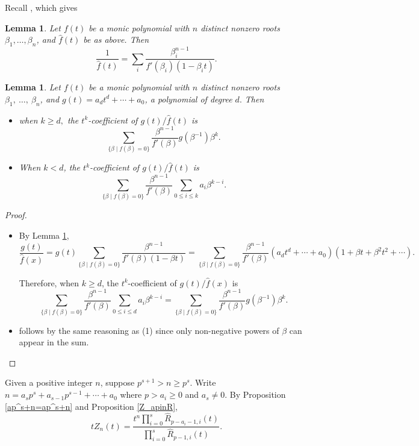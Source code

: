 \documentclass[11 pt]{amsart}
\theoremstyle{plain}
\newtheorem{lemma}[thm]{Lemma}
\theoremstyle{definition}
\theoremstyle{remark}
\def\b{\beta}
\begin{document}
Recall \cite[, Lemma 2.3]{larsen2024boundsmathrmsl2indecomposablestensorpowers}, which gives

\begin{lemma} \label{1/hat}
    Let $f(t)$ be a monic polynomial with $n$ distinct nonzero roots $\b_1, \ldots, \b_n$, and $\hat{f}(t)$ be as above. Then $$\frac{1}{\hat{f}(t)}=\sum_i \frac{\beta_i^{n-1}}{f'(\beta_i)(1-\beta_i t)}.$$
\end{lemma}


\begin{lemma} \label{g/fhat}
   Let $f(t)$ be a monic polynomial with $n$ distinct nonzero roots $\beta_1,\ \ldots,\  \beta_n$, and $g(t)=a_dt^d+\cdots+a_0$, a polynomial of degree $d.$ Then \begin{itemize}
       \item[(1)]  when $k \ge d,$  the $t^k$-coefficient of $g(t)/\hat{f}(t)$ is $$\sum_{\{ \b \mid f(\b)=0  \}}  \frac{\b^{n-1}}{f'(\b)}g(\b^{-1})\b^k.$$

       \item [(2)]  When $k<d$, the $t^k$-coefficient of $g(t)/\hat{f}(t)$ is $$\sum_{\{ \b \mid f(\b)=0  \}} \frac{\b^{n-1}}{f'(\b)}\sum_{0 \le i \le k} a_i\b^{k-i}.$$
   \end{itemize}
   
   
  
\end{lemma}

\begin{proof}
    \begin{itemize}
        \item [(1)]By Lemma \ref{1/hat}, $$\frac{g(t)}{\hat{f}(x)}=g(t)\sum_{\{ \b \mid f(\b)=0  \}} \frac{\beta^{n-1}}{f'(\beta)(1-\beta  t)}=\sum_{\{ \b \mid f(\b)=0  \}} \frac{\beta^{n-1}}{f'(\beta)}(a_dt^d+\cdots+a_0)(1+\b t+\b^2t^2+\cdots).$$

    Therefore, when $k \ge d$, the $t^k$-coefficient of $g(t)/\hat{f}(x)$ is $$\sum_{\{ \b \mid f(\b)=0  \}} \frac{\b^{n-1}}{f'(\b)}\sum_{0 \le i \le d} a_i\b^{k-i}=\sum_{\{ \b \mid f(\b)=0  \}} \frac{\b^{n-1}}{f'(\b)} g(\b^{-1}) \b^k.$$

        \item [(2)] follows by the same reasoning as (1) since only non-negative powers of $\b$ can appear in the sum.    
    \end{itemize}    
\end{proof}


    
Given a positive integer $n$, suppose $p^{s+1}>n \ge p^s$. Write $n=a_sp^{s}+a_{s-1}p^{s-1}+ \cdots + a_0 $ where $p>a_i \ge 0$ and $a_s \neq 0$. By Proposition \ref{ap^s+n=ap^s+n} and Proposition \ref{Z_apinR},  
\begin{equation*}
    tZ_n(t)=\frac{t^n \prod_{i=0}^s \widehat{R}_{p-a_i-1,i}(t)}{\prod_{i=0}^s\widehat{R}_{p-1,i}(t)}.
\end{equation*}
\end{document}
